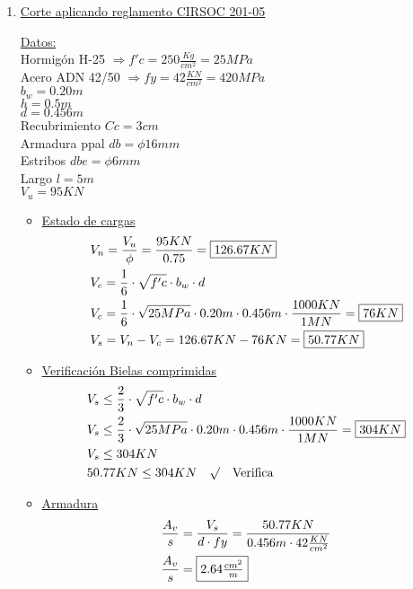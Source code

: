 \begin{enumerate}
\item \underline{Corte aplicando reglamento CIRSOC 201-05}

\underline{Datos:}\\
Hormigón H-25 $\Rightarrow f'c = 250 \frac{Kg}{cm^2} = 25 MPa$\\
Acero ADN 42/50 $\Rightarrow fy = 42 \frac{KN}{cm^2} = 420 MPa$\\
$b_w = 0.20m $\\
$h = 0.5m $\\
$d= 0.456m $\\
Recubrimiento $Cc = 3cm$\\
Armadura ppal $db = \phi 16mm$\\
Estribos $dbe = \phi 6mm$\\
Largo $l = 5m$\\
$V_u = 95KN$\\


\begin{itemize}
\item \underline{Estado de cargas}
\begin{align*}
& V_n = \frac{V_u}{\phi} = \frac{95KN}{0.75} = \framebox{$126.67KN$}\\
& V_c = \frac{1}{6} \cdot \sqrt{f'c} \cdot b_w \cdot d\\
& V_c = \frac{1}{6} \cdot \sqrt{25MPa} \cdot 0.20m \cdot 0.456m \cdot \frac{1000KN}{1MN} = \framebox{$76KN$}\\
& V_s = V_n - V_c = 126.67KN - 76KN = \framebox{$50.77KN$}
\end{align*}

\item \underline{Verificación Bielas comprimidas}
\begin{align*}
& V_s \leq \frac{2}{3} \cdot \sqrt{f'c} \cdot b_w \cdot d\\
& V_s \leq \frac{2}{3} \cdot \sqrt{25MPa} \cdot 0.20m \cdot 0.456m \cdot \frac{1000KN}{1MN} = \framebox{$304KN$}\\
& V_s \leq 304KN\\
& 50.77KN \leq 304KN \quad \surd \quad \text{Verifica}
\end{align*}

\item \underline{Armadura}
\begin{align*}
& \frac{A_v}{s} = \frac{V_s}{d \cdot fy} = \frac{50.77KN}{0.456m \cdot 42 \frac{KN}{cm^2}}\\
& \frac{A_v}{s} = \framebox{$2.64 \frac{cm^2}{m}$}
\end{align*}


\end{itemize}
\end{enumerate}
